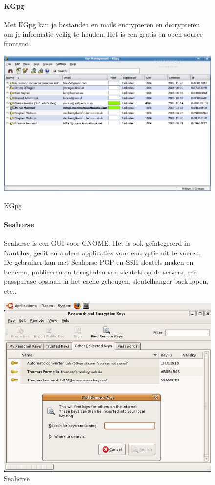 \documentclass[12pt]{article}
\begin{document}
				\begin{figure}[!ht]				
					\paragraph{KGpg}\cite{Kgpg}
						Met KGpg kan je bestanden en mails encrypteren en decrypteren om je informatie veilig te houden.
						Het is een gratis en open-source frontend.
					\begin{center}
						\includegraphics[scale=0.2]{Pictures/kgpg}
					\end{center}
					\caption{KGpg}
				
					\paragraph{Seahorse} \cite{Seahorse}
						Seahorse is een GUI voor GNOME. Het is ook geïntegreerd in Nautilus, gedit en andere applicaties voor encryptie uit te voeren.
						De gebruiker kan met Seahorse PGP en SSH sleutels maken en beheren, publiceren en terughalen van sleutels op de servers, een passphrase opslaan in het cache 								geheugen, sleutelhanger backuppen, etc..
					\begin{center}
						\includegraphics[scale=0.4]{Pictures/Seahorse}
					\end{center}
					\caption{Seahorse}
				\end{figure}
				
\end{document}
